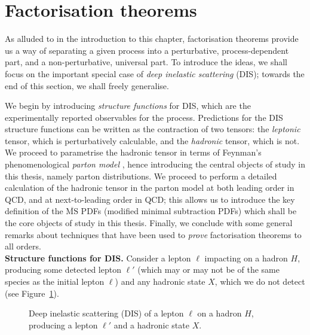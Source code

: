 \documentclass[withindex,glossary]{cam-thesis}
\begin{document}
\section{Factorisation theorems}
\label{sec:factorisation}

As alluded to in the introduction to this chapter, factorisation theorems provide us a way of separating a given process into a perturbative, process-dependent part, and a non-perturbative, universal part. To introduce the ideas, we shall focus on the important special case of \textit{deep inelastic scattering} (DIS); towards the end of this section, we shall freely generalise.

We begin by introducing \textit{structure functions} for DIS, which are the experimentally reported observables for the process. Predictions for the DIS structure functions can be written as the contraction of two tensors: the \textit{leptonic} tensor, which is perturbatively calculable, and the \textit{hadronic} tensor, which is not. We proceed to parametrise the hadronic tensor in terms of Feynman's phenomenological \textit{parton model} \cite{Feynman:1969wa}, hence introducing the central objects of study in this thesis, namely parton distributions. We proceed to perform a detailed calculation of the hadronic tensor in the parton model at both leading order in QCD, and at next-to-leading order in QCD; this allows us to introduce the key definition of the $\overline{\text{MS}}$ PDFs (modified minimal subtraction PDFs) which shall be the core objects of study in this thesis. Finally, we conclude with some general remarks about techniques that have been used to \textit{prove} factorisation theorems to all orders. \\

\noindent \textbf{Structure functions for DIS.} Consider a lepton $\ell$ impacting on a hadron $H$, producing some detected lepton $\ell'$ (which may or may not be of the same species as the initial lepton $\ell$) and any hadronic state $X$, which we do not detect (see Figure~\ref{fig:dis}). 

\begin{figure}[H]
\centering
\caption{Deep inelastic scattering (DIS) of a lepton $\ell$ on a hadron $H$, producing a lepton $\ell'$ and a hadronic state $X$.}
\label{fig:dis}
\end{figure}
\end{document}
